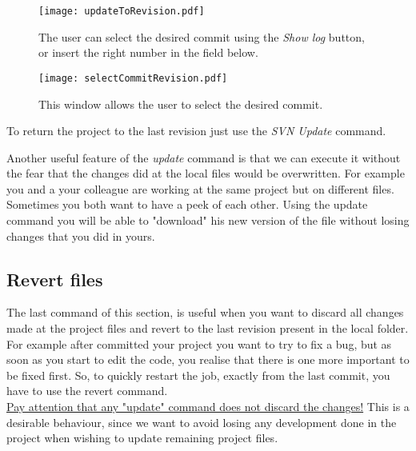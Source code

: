 \begin{figure}[htbp]
    \centering
    \texttt{[image: updateToRevision.pdf]}
    \caption{The user can select the desired commit using the \textit{Show log} button, or insert the right number in the field below.}
    \label{fig:updateToRevision}
\end{figure}





\begin{figure}[ht!]
    \centering
    \texttt{[image: selectCommitRevision.pdf]}
    \caption{This window allows the user to select the desired commit.}
    \label{fig:selectCommitRevision}
\end{figure}





To return the project to the last revision just use the \textit{SVN Update} command.

Another useful feature of the \textit{update} command is that we can execute it without the fear that the changes did at the local files would be overwritten. For example you and a your colleague are working at the same project but on different files.
Sometimes you both want to have a peek of each other. Using the update command you will be able to "download" his new version of the file without losing changes that you did in yours.








\subsection{Revert files}
\label{subsection:revertFiles}

The last command of this section, is useful when you want to discard all changes made at the project files and revert to the last revision present in the local folder.\\


For example after committed your project you want to try to fix a bug, but as soon as you start to edit the code, you realise that there is one more important to be fixed first. So, to quickly restart the job, exactly from the last commit, you have to use the revert command.\\


\underline{Pay attention that any "update" command does not discard the changes!} This is a desirable behaviour, since we want to avoid losing any development done in the project when wishing to update remaining project files.\\

